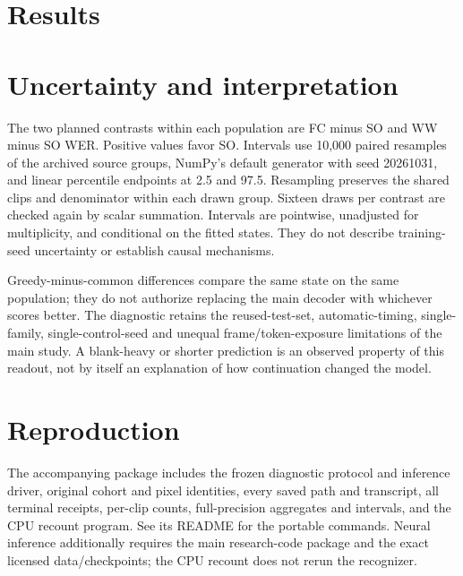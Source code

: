 \documentclass[12pt,a4paper]{article}
\begin{document}
\section{Results}


\section{Uncertainty and interpretation}
The two planned contrasts within each population are FC minus SO and WW minus
SO WER. Positive values favor SO. Intervals use 10,000 paired resamples of the
archived source groups, NumPy's default generator with seed 20261031, and linear
percentile endpoints at 2.5 and 97.5. Resampling preserves the shared clips and
denominator within each drawn group. Sixteen draws per contrast are checked
again by scalar summation. Intervals are pointwise, unadjusted for multiplicity,
and conditional on the fitted states. They do not describe training-seed
uncertainty or establish causal mechanisms.

Greedy-minus-common differences compare the same state on the same population;
they do not authorize replacing the main decoder with whichever scores better.
The diagnostic retains the reused-test-set, automatic-timing, single-family,
single-control-seed and unequal frame/token-exposure limitations of the main
study. A blank-heavy or shorter prediction is an observed property of this
readout, not by itself an explanation of how continuation changed the model.

\section{Reproduction}
The accompanying package includes the frozen diagnostic protocol and inference
driver, original cohort and pixel identities, every saved path and transcript,
all terminal receipts, per-clip counts, full-precision aggregates and intervals,
and the CPU recount program. See its README for the portable commands. Neural
inference additionally requires the main research-code package and the exact
licensed data/checkpoints; the CPU recount does not rerun the recognizer.
\end{document}
